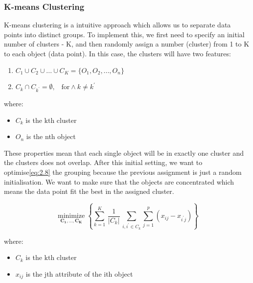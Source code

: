 \documentclass[11pt]{article} %
\theoremstyle{plain}
\theoremstyle{definition}
\begin{document}
\subsubsection{K-means Clustering}

K-means clustering is a intuitive approach which allows us to separate data points into distinct groups. To implement this, we first need to specify an initial number of clusters - K, and then randomly assign a number (cluster) from 1 to K to each object (data point). In this case, the clusters will have two features\cite{james/itsl:2009}:
{
  \begin{enumerate}
    \item ${C_1}\cup{C_2}\cup...\cup{C_K} = \{{O_1}, {O_2},..., {O_n}\}$
    \item ${C_k}\cap{C_{k^\prime}} = \emptyset \text{,}\quad \text{for} \wedge k \neq k^\prime$
  \end{enumerate}

  \footnotesize
  where:
    \begin{itemize}[label=-, leftmargin=4em, itemsep=0.1em]
      \item ${C_k}$ is the kth cluster
      \item ${O_n}$ is the nth object
    \end{itemize}
}

These properties mean that each single object will be in exactly one cluster and the clusters does not overlap. After this initial setting, we want to optimise\eqref{eq:2.8} the grouping because the previous assignment is just a random initialisation. We want to make sure that the objects are concentrated which means the data point fit the best in the assigned cluster.

{
  \begin{equation}
    \label{eq:2.8}
    \tag{2.8}
    {{\underset {\mathbf {C_1,...,C_K} }{\operatorname {minimize} }}\left\{\sum _{k=1}^{K}\,{\frac {1}{|C_{k}|}}\,\sum _{ {i} , {i^\prime} \in C_{k}}\sum_{j=1}^{p}(x_{ij}-x_{{i^\prime}j})\right\}}
  \end{equation}

  \footnotesize
  where:
  \begin{itemize}[label=-, leftmargin=4em, itemsep=0.1em]
    \item ${C_k}$ is the kth cluster
    \item ${x_{ij}}$ is the jth attribute of the ith object
  \end{itemize}
}
\end{document}
